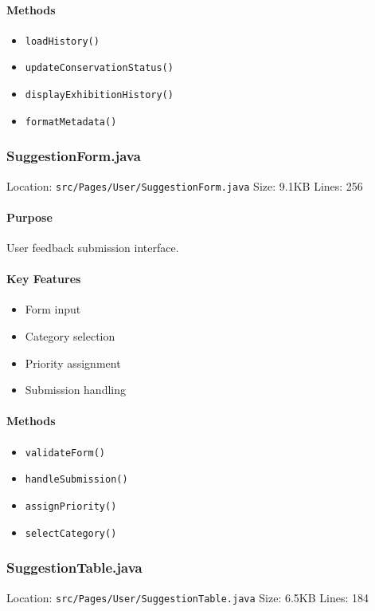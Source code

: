 \documentclass[12pt,a4paper]{article}
\begin{document}
\paragraph{Methods}
\begin{itemize}
    \item \texttt{loadHistory()}
    \item \texttt{updateConservationStatus()}
    \item \texttt{displayExhibitionHistory()}
    \item \texttt{formatMetadata()}
\end{itemize}

\subsubsection{SuggestionForm.java}
Location: \texttt{src/Pages/User/SuggestionForm.java}
Size: 9.1KB
Lines: 256

\paragraph{Purpose}
User feedback submission interface.

\paragraph{Key Features}
\begin{itemize}
    \item Form input
    \item Category selection
    \item Priority assignment
    \item Submission handling
\end{itemize}

\paragraph{Methods}
\begin{itemize}
    \item \texttt{validateForm()}
    \item \texttt{handleSubmission()}
    \item \texttt{assignPriority()}
    \item \texttt{selectCategory()}
\end{itemize}

\subsubsection{SuggestionTable.java}
Location: \texttt{src/Pages/User/SuggestionTable.java}
Size: 6.5KB
Lines: 184
\end{document}
